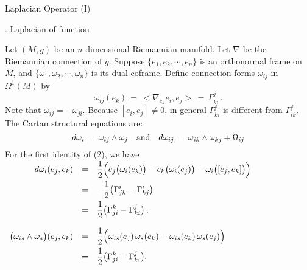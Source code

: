 \documentclass{article}[12pt,a4paper]
\begin{document}

\pagestyle{empty}
\begin{center} Laplacian Operator (I) \end{center}

\begin{center} {. Laplacian of function}\end{center}
Let $(M, g)$ be an $n$-dimensional Riemannian manifold. 
Let $\nabla$ be the Riemannian connection of $g$. 
Suppose $\{e_1, e_2, \cdots, e_n\} $ is an orthonormal frame on $M$, 
and $\{\omega_1, \omega_2, \cdots, \omega_n\} $ is its dual coframe. 
Define connection forms $\omega_{ij}$ in $\Omega^1(M)$ by
\begin{equation} 
\omega_{ij}(e_k) \,=\, <\nabla_{e_k}e_i, e_j>  \,=\, \Gamma_{ki}^j \,.
\end{equation}
Note that $\omega_{ij} = -\omega_{ji}$. Because $[e_i,e_j]\neq 0$, 
in general $\Gamma_{ki}^j$ is different from $\Gamma_{ik}^j$.  \\

The Cartan structural equations are:
\begin{equation} 
d\omega_i \,=\, \omega_{ij}\wedge \omega_j \quad \mbox{and} \quad
d\omega_{ij} \,=\, \omega_{ik}\wedge \omega_{kj} + \Omega_{ij}
\end{equation}
For the first identity of (2), we have\\[0.1in]
$\begin{array}{rcl}
d\omega_i(e_j, e_k) &=&\displaystyle 
	\frac{1}{2}\Big(e_j\big(\omega_i(e_k)\big) - e_k\big(\omega_i(e_j)\big) 
	- \omega_i\big([e_j,e_k]\big) \Big) \\[0.1in]
&=& \displaystyle 
	-\frac{1}{2}\big(\Gamma_{jk}^i - \Gamma_{kj}^i\big) \\[0.1in]
&=& \displaystyle 
	\frac{1}{2}\big( \Gamma_{ji}^k - \Gamma_{ki}^j \big)\,, \\[0.2in]
\big(\omega_{is}\wedge \omega_s\big)(e_j, e_k) &=& \displaystyle 
	\frac{1}{2}\Big( \omega_{is}(e_j)\, \omega_s(e_k) - \omega_{is}(e_k)\, \omega_s(e_j) \Big) \\[0.1in]
&=& \displaystyle 
	\frac{1}{2}\big( \Gamma_{ji}^k - \Gamma_{ki}^j \big).
\end{array} $ \\[0.2in]
\end{document}

